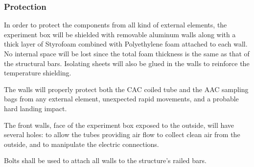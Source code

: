 



\subsubsection{Protection}

In order to protect the components from all kind of external elements, the experiment box will be shielded with removable aluminum walls along with a thick layer of Styrofoam combined with Polyethylene foam attached to each wall. No internal space will be lost since the total foam thickness is the same as that of the structural bars. Isolating sheets will also be glued in the walls to reinforce the temperature shielding.

The walls will properly protect both the CAC coiled tube and the AAC sampling bags from any external element, unexpected rapid movements, and a probable hard landing impact.




The front walls, face of the experiment box exposed to the outside, will have several holes: to allow the tubes providing air flow to collect clean air from the outside, and to manipulate the electric connections.


Bolts shall be used to attach all walls to the structure's railed bars.


